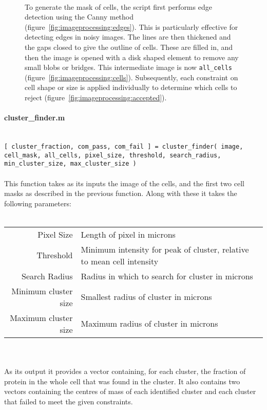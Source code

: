 \documentclass[../main.tex]{subfiles}
\begin{document}
\begin{figure}[p]
\begin{center}
\\
\caption{To generate the mask of cells, the script first performs edge detection using the Canny method\cite{canny} (figure~\ref{fig:imageprocessing:edges}). This is particularly effective for detecting edges in noisy images. The lines are then thickened and the gaps closed to give the outline of cells. These are filled in, and then the image is opened with a disk shaped element to remove any small blobs or bridges. This intermediate image is now \texttt{all\_cells} (figure~\ref{fig:imageprocessing:cells}). Subsequently, each constraint on cell shape or size is applied individually to determine which cells to reject (figure~\ref{fig:imageprocessing:accepted}).}
\label{fig:imageprocessing:celldetection}
\end{center}
\end{figure}




\paragraph{cluster\_finder.m}\ \\
\texttt{[ cluster\_fraction, com\_pass, com\_fail ] = cluster\_finder( image, cell\_mask, all\_cells, pixel\_size, threshold, search\_radius, min\_cluster\_size, max\_cluster\_size ) }
\\\\
This function takes as its inputs the image of the cells, and the first two cell masks as described in the previous function. Along with these it takes the following parameters:
\\\\
\begin{tabular}{rl}
Pixel Size		&	Length of pixel in microns\\
Threshold		&	Minimum intensity for peak of cluster, relative to mean cell intensity\\
Search Radius 	&	Radius in which to search for cluster in microns\\
Minimum cluster size	&	Smallest radius of cluster in microns\\
Maximum cluster size	&	Maximum radius of cluster in microns
\end{tabular}
\\\\
As its output it provides a vector containing, for each cluster, the fraction of protein in the whole cell that was found in the cluster. It also contains two vectors containing the centres of mass of each identified cluster and each cluster that failed to meet the given constraints.
\end{document}
